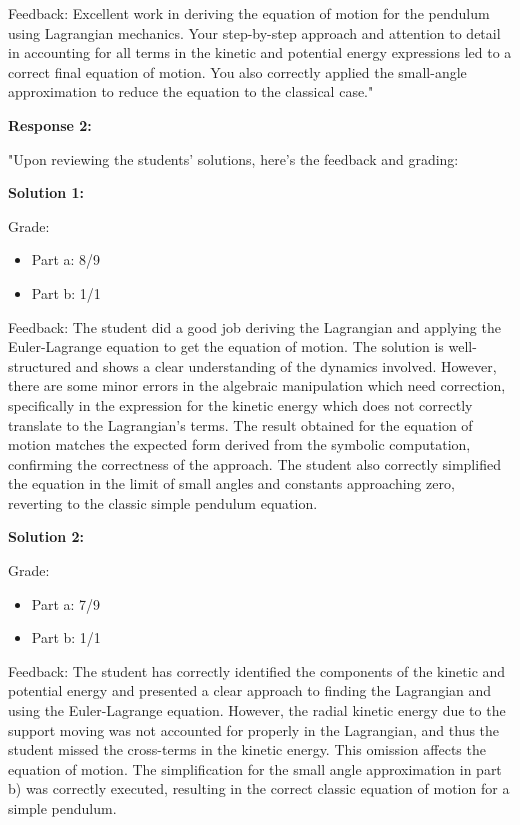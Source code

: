 \documentclass[a4paper,11pt]{article}
\begin{document}
Feedback: Excellent work in deriving the equation of motion for the pendulum using Lagrangian mechanics. Your step-by-step approach and attention to detail in accounting for all terms in the kinetic and potential energy expressions led to a correct final equation of motion. You also correctly applied the small-angle approximation to reduce the equation to the classical case."

\textbf{Response 2:}

"Upon reviewing the students' solutions, here's the feedback and grading:

\textbf{Solution 1:}

Grade:
\begin{itemize}
    \item Part a: 8/9
    \item Part b: 1/1
\end{itemize}

Feedback:
The student did a good job deriving the Lagrangian and applying the Euler-Lagrange equation to get the equation of motion. The solution is well-structured and shows a clear understanding of the dynamics involved. However, there are some minor errors in the algebraic manipulation which need correction, specifically in the expression for the kinetic energy which does not correctly translate to the Lagrangian's terms. The result obtained for the equation of motion matches the expected form derived from the symbolic computation, confirming the correctness of the approach. The student also correctly simplified the equation in the limit of small angles and constants approaching zero, reverting to the classic simple pendulum equation.

\textbf{Solution 2:}

Grade:
\begin{itemize}
    \item Part a: 7/9
    \item Part b: 1/1
\end{itemize}

Feedback:
The student has correctly identified the components of the kinetic and potential energy and presented a clear approach to finding the Lagrangian and using the Euler-Lagrange equation. However, the radial kinetic energy due to the support moving was not accounted for properly in the Lagrangian, and thus the student missed the cross-terms in the kinetic energy. This omission affects the equation of motion. The simplification for the small angle approximation in part b) was correctly executed, resulting in the correct classic equation of motion for a simple pendulum.
\end{document}
